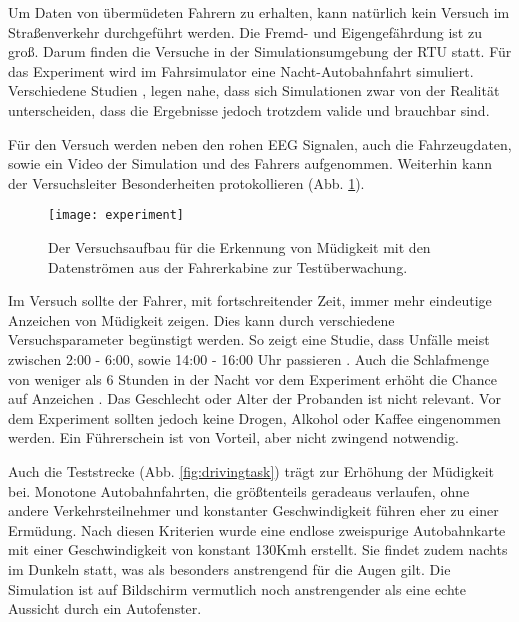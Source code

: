 \label{chap:data}
Um Daten von übermüdeten Fahrern zu erhalten, kann natürlich kein Versuch im Straßenverkehr durchgeführt werden. Die Fremd- und Eigengefährdung ist zu groß. Darum finden die Versuche in der Simulationsumgebung der \acl{RTU} statt. Für das Experiment wird im Fahrsimulator eine Nacht-Autobahnfahrt simuliert. Verschiedene Studien \cite{Engstrom_2322937}, \cite{Horne_1757738} legen nahe, dass sich Simulationen zwar von der Realität unterscheiden, dass  die Ergebnisse jedoch trotzdem valide und brauchbar sind.

Für den Versuch werden neben den rohen EEG Signalen, auch die Fahrzeugdaten, sowie ein Video der Simulation und des Fahrers aufgenommen. Weiterhin kann der Versuchsleiter Besonderheiten protokollieren (Abb. \ref{fig:experiment}).

\begin{figure}[h] 
  \begin{center}
    \texttt{[image: experiment]}
    \caption[Versuchsaufbau Experiment]{Der Versuchsaufbau für die Erkennung von Müdigkeit mit den Datenströmen aus der Fahrerkabine zur Testüberwachung. \label{fig:experiment}}
  \end{center}
\end{figure}

Im Versuch sollte der Fahrer, mit fortschreitender Zeit, immer mehr eindeutige Anzeichen von Müdigkeit zeigen. Dies kann durch verschiedene Versuchsparameter begünstigt werden. So zeigt eine Studie, dass Unfälle meist zwischen 2:00 - 6:00, sowie 14:00 - 16:00 Uhr passieren \cite{Horne_1757738}. Auch die Schlafmenge von weniger als 6 Stunden in der Nacht vor dem Experiment erhöht die Chance auf Anzeichen \cite{Engstrom_2322937}. Das Geschlecht oder Alter der Probanden ist nicht relevant. Vor dem Experiment sollten jedoch keine Drogen, Alkohol oder Kaffee eingenommen werden. Ein Führerschein ist von Vorteil, aber nicht zwingend notwendig.

Auch die Teststrecke (Abb. \ref{fig:drivingtask}) trägt zur Erhöhung der Müdigkeit bei. Monotone Autobahnfahrten, die größtenteils geradeaus verlaufen, ohne andere Verkehrsteilnehmer und konstanter Geschwindigkeit führen eher zu einer Ermüdung. Nach diesen Kriterien wurde eine endlose zweispurige Autobahnkarte mit einer Geschwindigkeit von konstant 130Kmh erstellt. Sie findet zudem nachts im Dunkeln statt, was als besonders anstrengend für die Augen gilt. Die Simulation ist auf Bildschirm vermutlich noch anstrengender als eine echte Aussicht durch ein Autofenster.

